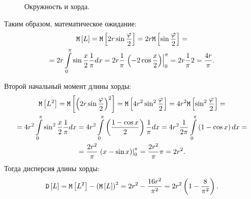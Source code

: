 \begin{figure}[!ht]
    \centering
    \caption{Окружность и хорда.}
    \label{10:450:hord}
\end{figure}

Таким образом, математическое ожидание:
\begin{multline}
    \mathtt{M} \left [ L \right ]
    = \mathtt{M} \left [ 2 r \sin \frac{\varphi}{2} \right ]
    = 2 r \mathtt{M} \left [ \sin \frac{\varphi}{2} \right ] = \\
    = 2 r \int \limits_0^\pi \sin \frac{x}{2} \frac{1}{\pi} d x
    = 2 r \frac{1}{\pi} \left . \left ( - 2 \cos \frac{x}{2} \right ) \right |_0^\pi
    = 2 r \frac{1}{\pi} 2
    = \frac{4 r}{\pi} .
\end{multline}

Второй начальный момент длины хорды:
\begin{multline}
    \mathtt{M} \left [ L^2 \right ]
    = \mathtt{M} \left [ \left ( 2 r \sin \frac{\varphi}{2} \right )^2 \right ]
    = \mathtt{M} \left [ 4 r^2 \sin^2 \frac{\varphi}{2} \right ]
    = 4 r^2 \mathtt{M} \left [ \sin^2 \frac{\varphi}{2} \right ] = \\
    = 4 r^2 \int \limits_0^\pi \sin^2 \frac{x}{2} \frac{1}{\pi} d x
    = 4 r^2 \int \limits_0^\pi \left ( \frac{1 - \cos x}{2} \right ) \frac{1}{\pi} d x
    = 4 r^2 \frac{1}{2 \pi} \int \limits_0^\pi \left ( 1 - \cos x \right ) d x = \\
    = \frac{2 r^2}{\pi} \left . \left ( x - \sin x \right ) \right |_0^\pi
    = \frac{2 r^2}{\pi} \pi
    = 2 r^2 .
\end{multline}
Тогда дисперсия длины хорды:
\begin{equation}
    \mathtt{D} \left [ L \right ]
    = \mathtt{M} \left [ L^2 \right ] - \left ( \mathtt{M} \left [ L \right ] \right )^2
    = 2 r^2 - \frac{16 r^2}{\pi^2}
    = 2 r^2 \left ( 1 - \frac{8}{\pi^2} \right ).
\end{equation}


